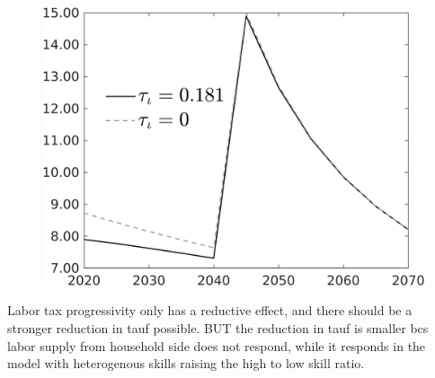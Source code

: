 \documentclass[12pt]{article}
\begin{document}
\begin{figure}[h!!]
\begin{minipage}[]{0.32\textwidth}
	\end{minipage}	
	\begin{minipage}[]{0.32\textwidth}
		\includegraphics[width=1\textwidth]{../../codding_model/own_basedOnFried/optimalPol_010922_revision/figures/all_13Sept22/CompTauf_bytaul_Reg0_gAg_spillover0_nsk1_xgr0_knspil0_sep0_LFlimit1_emsbase0_countec0_GovRev0_etaa0.79_lgd1.png}
	\end{minipage}	
\end{figure}
Labor tax progressivity only has a reductive effect, and there should be  a stronger reduction in tauf possible. BUT the reduction in tauf is smaller bcs labor supply from household side does not respond, while it responds in the model with heterogenous skills raising the high to low skill ratio. 
\end{document}
